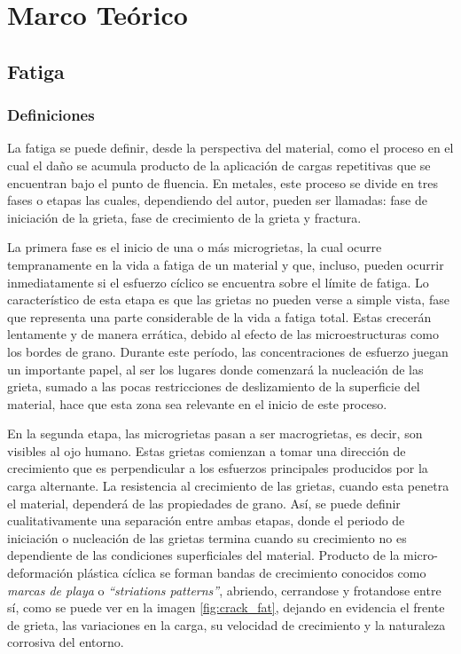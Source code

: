 \chapter{Marco Teórico}
\section{Fatiga}

\subsection{Definiciones}
La fatiga se puede definir, desde la perspectiva del material, como el proceso en el cual el daño se acumula producto de la aplicación de cargas repetitivas que se encuentran bajo el punto de fluencia. En metales, este proceso se divide en tres fases o etapas las cuales, dependiendo del autor, pueden ser llamadas: fase de iniciación de la grieta, fase de crecimiento de la grieta y fractura.

La primera fase es el inicio de una o más microgrietas, la cual ocurre tempranamente en la vida a fatiga de un material y que, incluso, pueden ocurrir inmediatamente si el esfuerzo cíclico se encuentra sobre el límite de fatiga. Lo característico de esta etapa es que las grietas no pueden verse a simple vista, fase que representa una parte considerable de la vida a fatiga total. Estas crecerán lentamente y de manera errática, debido al efecto de las microestructuras como los bordes de grano. Durante este período, las concentraciones de esfuerzo juegan un importante papel, al ser los lugares donde comenzará la nucleación de las grieta, sumado a las pocas restricciones de deslizamiento de la superficie del material, hace que esta zona sea relevante en el inicio de este proceso.

En la segunda etapa, las microgrietas pasan a ser macrogrietas, es decir, son visibles al ojo humano. Estas grietas comienzan a tomar una dirección de crecimiento que es perpendicular a los esfuerzos principales producidos por la carga alternante. La resistencia al crecimiento de las grietas, cuando esta penetra el material, dependerá de las propiedades de grano. Así, se puede definir cualitativamente una separación entre ambas etapas, donde el periodo de iniciación o nucleación de las grietas termina cuando su crecimiento no es dependiente de las condiciones superficiales del material. Producto de la micro-deformación plástica cíclica se forman bandas de crecimiento conocidos como \textit{marcas de playa} o \textit{``striations patterns''}, abriendo, cerrandose y frotandose entre sí, como se puede ver en la imagen \ref{fig:crack_fat}, dejando en evidencia el frente de grieta, las variaciones en la carga, su velocidad de crecimiento y la naturaleza corrosiva del entorno.


